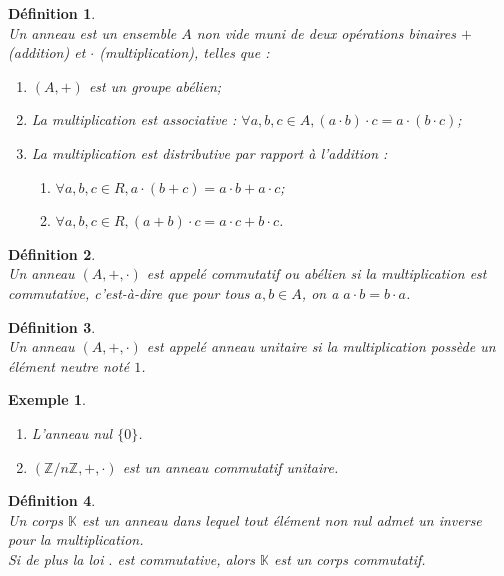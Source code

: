 \documentclass[a4paper, 14pt]{report}
\newtheorem{definition}{Définition}[section]
\newtheorem{example}{Exemple}[section]
\begin{document}
\begin{onehalfspace}
{\begin{definition} \cite{lang2012algebra}\\
Un anneau est un ensemble \( A \) non vide muni de deux opérations binaires \( + \) (addition) et \( \cdot \) (multiplication), telles que :
	\begin{enumerate} [label=\roman*)]
		\item \( (A, +) \) est un groupe abélien;
		\item La multiplication est associative : \(\forall a, b, c \in A, (a \cdot b) \cdot c = a \cdot (b \cdot c) \);
		\item La multiplication est distributive par rapport à l'addition :
		\begin{enumerate}
			\item \(\forall a, b, c \in R, a \cdot (b + c) = a \cdot b + a \cdot c \);
			\item \(\forall a, b, c \in R, (a + b) \cdot c = a \cdot c + b \cdot c \).
		\end{enumerate}
	\end{enumerate}
\end{definition}

\begin{definition} \cite{lang2012algebra}\\
Un anneau \((A, +, \cdot)\) est appelé \emph{commutatif} ou \emph{abélien} si la multiplication est commutative, c'est-à-dire que pour tous \( a, b \in A \), on a \( a \cdot b = b \cdot a \).
\end{definition}

\begin{definition} \cite{lang2012algebra}\\
Un anneau \((A, +, \cdot)\) est appelé anneau unitaire si la multiplication possède un élément neutre noté \( 1 \).
\end{definition}

\begin{example} \
	\begin{enumerate}
		\item L’anneau nul \(\{0\}\).
		\item \((\mathbb{Z}/n\mathbb{Z}, +, \cdot)\) est un anneau commutatif unitaire.
	\end{enumerate}
\end{example}


\begin{definition} \cite{lang2012algebra}\\
Un corps \(\mathbb{K}\) est un anneau dans lequel tout élément non nul admet un inverse pour la multiplication.\\
Si de plus la loi $.$ est commutative, alors \(\mathbb{K}\) est un corps commutatif.
\end{definition}

}
\end{onehalfspace}
\end{document}
